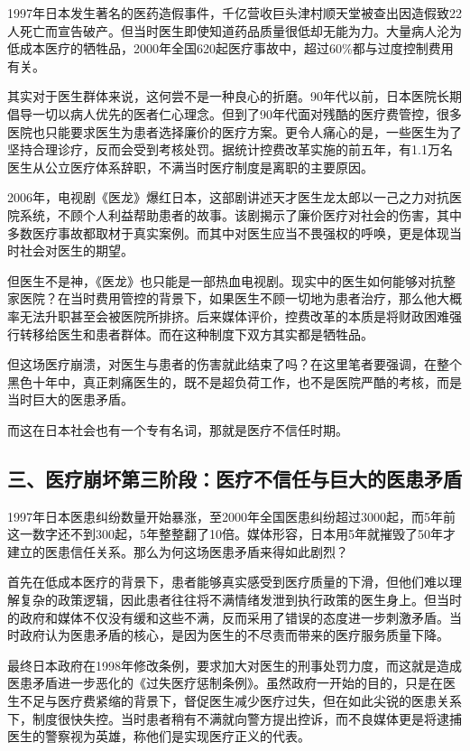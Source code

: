 1997年日本发生著名的医药造假事件，千亿营收巨头津村顺天堂被查出因造假致22人死亡而宣告破产。但当时医生即使知道药品质量很低却无能为力。大量病人沦为低成本医疗的牺牲品，2000年全国620起医疗事故中，超过60\%都与过度控制费用有关。

其实对于医生群体来说，这何尝不是一种良心的折磨。90年代以前，日本医院长期倡导一切以病人优先的医者仁心理念。但到了90年代面对残酷的医疗费管控，很多医院也只能要求医生为患者选择廉价的医疗方案。更令人痛心的是，一些医生为了坚持合理诊疗，反而会受到考核处罚。据统计控费改革实施的前五年，有1.1万名医生从公立医疗体系辞职，不满当时医疗制度是离职的主要原因。

2006年，电视剧《医龙》爆红日本，这部剧讲述天才医生龙太郎以一己之力对抗医院系统，不顾个人利益帮助患者的故事。该剧揭示了廉价医疗对社会的伤害，其中多数医疗事故都取材于真实案例。而其中对医生应当不畏强权的呼唤，更是体现当时社会对医生的期望。

但医生不是神，《医龙》也只能是一部热血电视剧。现实中的医生如何能够对抗整家医院？在当时费用管控的背景下，如果医生不顾一切地为患者治疗，那么他大概率无法升职甚至会被医院所排挤。后来媒体评价，控费改革的本质是将财政困难强行转移给医生和患者群体。而在这种制度下双方其实都是牺牲品。

但这场医疗崩溃，对医生与患者的伤害就此结束了吗？在这里笔者要强调，在整个黑色十年中，真正刺痛医生的，既不是超负荷工作，也不是医院严酷的考核，而是当时巨大的医患矛盾。

而这在日本社会也有一个专有名词，那就是医疗不信任时期。

\subsection{三、医疗崩坏第三阶段：医疗不信任与巨大的医患矛盾}

1997年日本医患纠纷数量开始暴涨，至2000年全国医患纠纷超过3000起，而5年前这一数字还不到300起，5年整整翻了10倍。媒体形容，日本用5年就摧毁了50年才建立的医患信任关系。那么为何这场医患矛盾来得如此剧烈？

首先在低成本医疗的背景下，患者能够真实感受到医疗质量的下滑，但他们难以理解复杂的政策逻辑，因此患者往往将不满情绪发泄到执行政策的医生身上。但当时的政府和媒体不仅没有缓和这些不满，反而采用了错误的态度进一步刺激矛盾。当时政府认为医患矛盾的核心，是因为医生的不尽责而带来的医疗服务质量下降。

最终日本政府在1998年修改条例，要求加大对医生的刑事处罚力度，而这就是造成医患矛盾进一步恶化的《过失医疗惩制条例》。虽然政府一开始的目的，只是在医生不足与医疗费紧缩的背景下，督促医生减少医疗过失，但在如此尖锐的医患关系下，制度很快失控。当时患者稍有不满就向警方提出控诉，而不良媒体更是将逮捕医生的警察视为英雄，称他们是实现医疗正义的代表。

